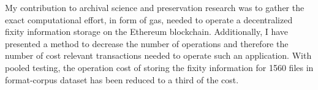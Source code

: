 My contribution to archival science and preservation research was to gather the exact computational effort, in form of gas, needed to operate a decentralized fixity information storage on the Ethereum blockchain. Additionally, I have presented a method to decrease the number of operations and therefore the number of cost relevant transactions needed to operate such an application. With pooled testing, the operation cost of storing the fixity information for 1560 files in format-corpus dataset has been reduced to a third of the cost.
